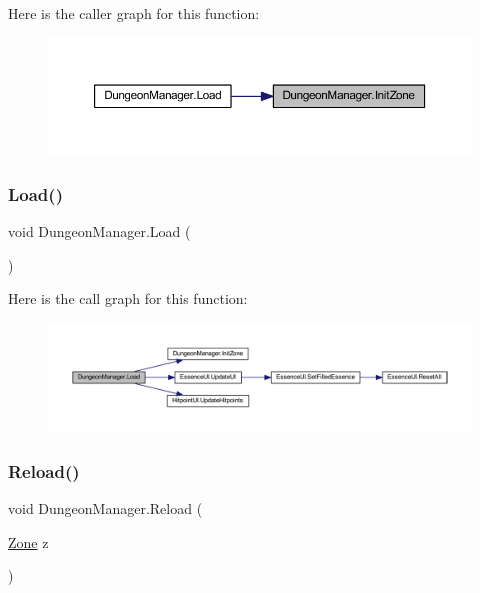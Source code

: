 Here is the caller graph for this function\+:\nopagebreak
\begin{figure}[H]
\begin{center}
\leavevmode
\includegraphics[width=350pt]{class_dungeon_manager_afc7ff9dc122b876f72a4f238496f3a26_icgraph}
\end{center}
\end{figure}
\mbox{\label{class_dungeon_manager_ac2c0ce668813e7b0a34b935364a5650f}} 
\subsubsection{\texorpdfstring{Load()}{Load()}}
{\footnotesize\ttfamily void Dungeon\+Manager.\+Load (\begin{DoxyParamCaption}{ }\end{DoxyParamCaption})}

Here is the call graph for this function\+:\nopagebreak
\begin{figure}[H]
\begin{center}
\leavevmode
\includegraphics[width=350pt]{class_dungeon_manager_ac2c0ce668813e7b0a34b935364a5650f_cgraph}
\end{center}
\end{figure}
\mbox{\label{class_dungeon_manager_af5da9360e25192d468c5e8461ff19f20}} 
\subsubsection{\texorpdfstring{Reload()}{Reload()}}
{\footnotesize\ttfamily void Dungeon\+Manager.\+Reload (\begin{DoxyParamCaption}\item[{\mbox{\hyperlink{class_dungeon_manager_a6558d4a01889674bf25c798f1b90a431}{Zone}}}]{z }\end{DoxyParamCaption})}

